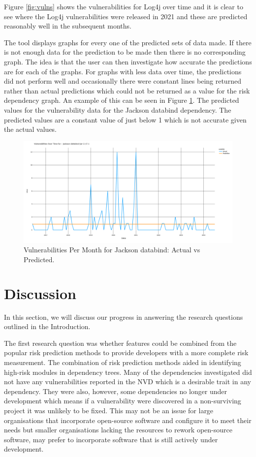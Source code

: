 \documentclass[conference]{IEEEtran}
\begin{document}
Figure \ref{fig:vulns} shows the vulnerabilities for Log4j over time and it is clear to see where the Log4j vulnerabilities were released in 2021 and these are predicted reasonably well in the subsequent months. 

The tool displays graphs for every one of the predicted sets of data made. If there is not enough data for the prediction to be made then there is no corresponding graph. The idea is that the user can then investigate how accurate the predictions are for each of the graphs. For graphs with less data over time, the predictions did not perform well and occasionally there were constant lines being returned rather than actual predictions which could not be returned as a value for the risk dependency graph. An example of this can be seen in Figure \ref{fig:const}. The predicted values for the vulnerability data for the Jackson databind dependency. The predicted values are a constant value of just below 1 which is not accurate given the actual values. 

\begin{figure}
    \centering
    \includegraphics[width=1\linewidth]{Const.png}
    \caption{Vulnerabilities Per Month for Jackson databind: Actual vs Predicted.} 
    \label{fig:const}
\end{figure}

\section{Discussion}
In this section, we will discuss our progress in answering the research questions outlined in the Introduction. 

The first research question was whether features could be combined from the popular risk prediction methods to provide developers with a more complete risk measurement. The combination of risk prediction methods aided in identifying high-risk modules in dependency trees. Many of the dependencies investigated did not have any vulnerabilities reported in the NVD which is a desirable trait in any dependency. They were also, however, some dependencies no longer under development which means if a vulnerability were discovered in a non-surviving project it was unlikely to be fixed. This may not be an issue for large organisations that incorporate open-source software and configure it to meet their needs but smaller organisations lacking the resources to rework open-source software, may prefer to incorporate software that is still actively under development.
\end{document}
